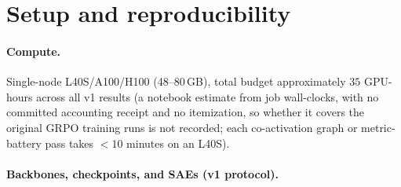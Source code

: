 \documentclass{article}
\begin{document}
\section{Setup and reproducibility}
\label{app:setup}

\paragraph{Compute.}
Single-node L40S/A100/H100 (48--80\,GB), total budget approximately $35$ GPU-hours across all v1 results (a notebook estimate from job wall-clocks, with no committed accounting receipt and no itemization, so whether it covers the original GRPO training runs is not recorded; each co-activation graph or metric-battery pass takes $<10$ minutes on an L40S).

\paragraph{Backbones, checkpoints, and SAEs (v1 protocol).}
\end{document}
